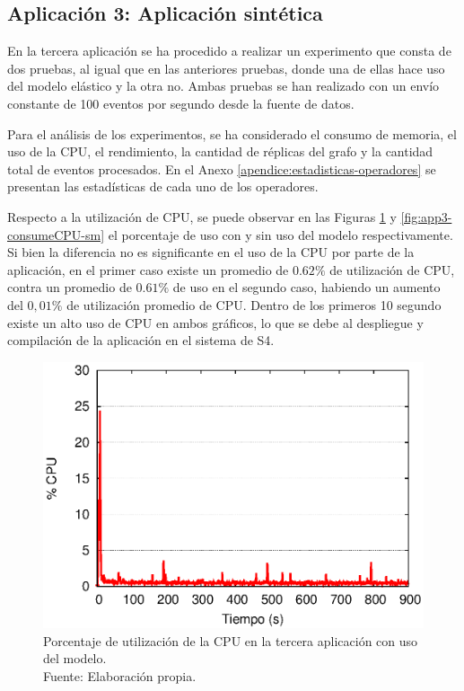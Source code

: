 \subsection{Aplicación 3: Aplicación sintética}
En la tercera aplicación se ha procedido a realizar un experimento que consta de dos pruebas, al igual que en las anteriores pruebas, donde una de ellas hace uso del modelo elástico y la otra no. Ambas pruebas se han realizado con un envío constante de 100 eventos por segundo desde la fuente de datos.

Para el análisis de los experimentos, se ha considerado el consumo de memoria, el uso de la CPU, \normalsize{el rendimiento, la cantidad de réplicas del grafo} y la cantidad total de eventos procesados. En el Anexo \ref{apendice:estadisticas-operadores} \normalsize{se presentan las estadísticas de cada uno de los operadores.}


Respecto a la utilización de CPU, se puede observar en las Figuras \ref{fig:app3-consumeCPU-cm} y \ref{fig:app3-consumeCPU-sm} el porcentaje de uso con y sin uso del modelo respectivamente. Si bien la diferencia no es significante en el uso de la CPU por parte de la aplicación, en el primer caso existe un promedio de $0.62\%$ de utilización de CPU, contra un promedio de $0.61\%$ de uso en el segundo caso, habiendo un aumento del $0,01\%$ de utilización promedio de CPU. Dentro de los primeros 10 segundo existe un alto uso de CPU en ambos gráficos, lo que se debe al despliegue y compilación de la aplicación en el sistema de S4.

\begin{figure}[!ht]
	\centering
	\captionsetup{justification=centering}
    \includegraphics[scale=0.65]{images/exp/app3/cm/fisical/consumeCPU.eps}
    \caption[Porcentaje de utilización de la CPU en la tercera aplicación con uso del modelo.]{Porcentaje de utilización de la CPU en la tercera aplicación con uso del modelo.\\Fuente: Elaboración propia.}
    \label{fig:app3-consumeCPU-cm}
\end{figure}

